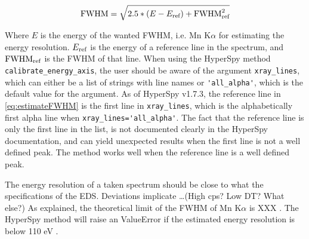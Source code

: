 \begin{equation}
    \label{eq:estimateFWHM}
    \textnormal{FWHM} =  \sqrt{2.5 * (E - E_\textnormal{ref}) + \textnormal{FWHM}^2_{\textnormal{ref}}}
\end{equation}

Where $E$ is the energy of the wanted FWHM, i.e. Mn K$\alpha$ for estimating the energy resolution.
$E_\textnormal{ref}$ is the energy of a reference line in the spectrum, and $\textnormal{FWHM}_{\textnormal{ref}}$ is the FWHM of that line.
When using the HyperSpy method \verb|calibrate_energy_axis|, the user should be aware of the argument \verb|xray_lines|, which can either be a list of strings with line names or \verb|'all_alpha'|, which is the default value for the argument.
As of HyperSpy v1.7.3, the reference line in \cref{eq:estimateFWHM} is the first line in \verb|xray_lines|, which is the alphabetically first alpha line when \verb|xray_lines='all_alpha'|.
The fact that the reference line is only the first line in the list, is not documented clearly in the HyperSpy documentation, and can yield unexpected results when the first line is not a well defined peak.
The method works well when the reference line is a well defined peak. 







The energy resolution of a taken spectrum should be close to what the specifications of the EDS.
Deviations implicate \dots (High cps? Low DT? What else?)
As explained, the theoretical limit of the FWHM of Mn K$\alpha$ is XXX .
The HyperSpy method will raise an ValueError if the estimated energy resolution is below 110 eV .




